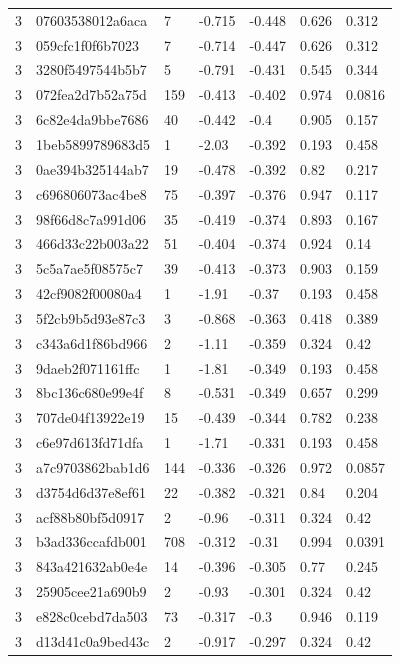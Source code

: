 \begin{tabular}{lllllll}
3 & 07603538012a6aca & 7 & -0.715 & -0.448 & 0.626 & 0.312 \\
3 & 059cfc1f0f6b7023 & 7 & -0.714 & -0.447 & 0.626 & 0.312 \\
3 & 3280f5497544b5b7 & 5 & -0.791 & -0.431 & 0.545 & 0.344 \\
3 & 072fea2d7b52a75d & 159 & -0.413 & -0.402 & 0.974 & 0.0816 \\
3 & 6c82e4da9bbe7686 & 40 & -0.442 & -0.4 & 0.905 & 0.157 \\
3 & 1beb5899789683d5 & 1 & -2.03 & -0.392 & 0.193 & 0.458 \\
3 & 0ae394b325144ab7 & 19 & -0.478 & -0.392 & 0.82 & 0.217 \\
3 & c696806073ac4be8 & 75 & -0.397 & -0.376 & 0.947 & 0.117 \\
3 & 98f66d8c7a991d06 & 35 & -0.419 & -0.374 & 0.893 & 0.167 \\
3 & 466d33c22b003a22 & 51 & -0.404 & -0.374 & 0.924 & 0.14 \\
3 & 5c5a7ae5f08575c7 & 39 & -0.413 & -0.373 & 0.903 & 0.159 \\
3 & 42cf9082f00080a4 & 1 & -1.91 & -0.37 & 0.193 & 0.458 \\
3 & 5f2cb9b5d93e87c3 & 3 & -0.868 & -0.363 & 0.418 & 0.389 \\
3 & c343a6d1f86bd966 & 2 & -1.11 & -0.359 & 0.324 & 0.42 \\
3 & 9daeb2f071161ffc & 1 & -1.81 & -0.349 & 0.193 & 0.458 \\
3 & 8bc136c680e99e4f & 8 & -0.531 & -0.349 & 0.657 & 0.299 \\
3 & 707de04f13922e19 & 15 & -0.439 & -0.344 & 0.782 & 0.238 \\
3 & c6e97d613fd71dfa & 1 & -1.71 & -0.331 & 0.193 & 0.458 \\
3 & a7c9703862bab1d6 & 144 & -0.336 & -0.326 & 0.972 & 0.0857 \\
3 & d3754d6d37e8ef61 & 22 & -0.382 & -0.321 & 0.84 & 0.204 \\
3 & acf88b80bf5d0917 & 2 & -0.96 & -0.311 & 0.324 & 0.42 \\
3 & b3ad336ccafdb001 & 708 & -0.312 & -0.31 & 0.994 & 0.0391 \\
3 & 843a421632ab0e4e & 14 & -0.396 & -0.305 & 0.77 & 0.245 \\
3 & 25905cee21a690b9 & 2 & -0.93 & -0.301 & 0.324 & 0.42 \\
3 & e828c0cebd7da503 & 73 & -0.317 & -0.3 & 0.946 & 0.119 \\
3 & d13d41c0a9bed43c & 2 & -0.917 & -0.297 & 0.324 & 0.42 \\

\end{tabular}
